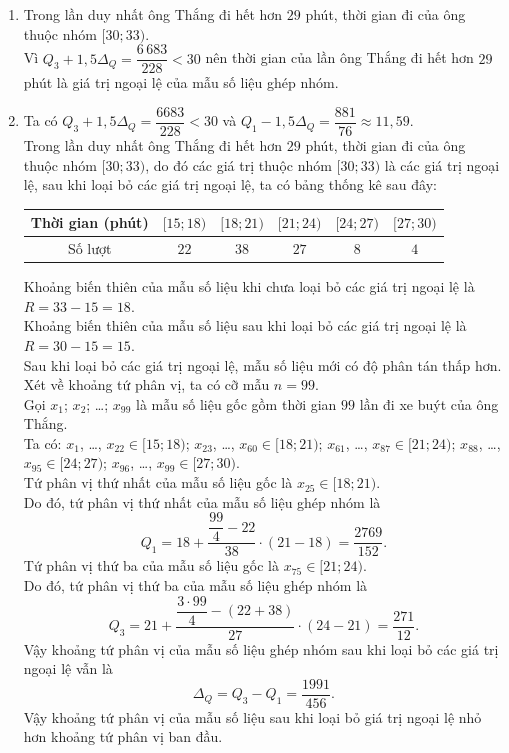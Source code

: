 \begin{bt}[Mức độ 3]
{\begin{enumerate}
				$$Q_3=21+\dfrac{\dfrac{3\cdot100}{4}-(22+38)}{27}\cdot(24-21)=\dfrac{68}{3}.$$
				Vậy khoảng tứ phân vị của mẫu số liệu ghép nhóm là $$\Delta_Q=Q_3-Q_1=\dfrac{505}{114}.$$
				\item Trong lần duy nhất ông Thắng đi hết hơn $29$ phút, thời gian đi của ông thuộc nhóm $[30;33)$.\\
				Vì $Q_3+1{,}5\Delta_Q=\dfrac{6\,683}{228}<30$ nên thời gian của lần ông Thắng đi hết hơn $29$ phút là giá trị ngoại lệ của mẫu số liệu ghép nhóm.
				\item 
				Ta có $Q_3+1{,}5\Delta_Q=\dfrac{6683}{228}<30$ và $Q_1-1{,}5\Delta_Q=\dfrac{881}{76}\approx11{,}59$.\\
				Trong lần duy nhất ông Thắng đi hết hơn $29$ phút, thời gian đi của ông thuộc nhóm $[30;33)$, do đó các giá trị thuộc nhóm $[30;33)$ là các giá trị ngoại lệ, sau khi loại bỏ các giá trị ngoại lệ, ta có bảng thống kê sau đây:
				\begin{center}
					\begin{tabular}{|c|c|c|c|c|c|}
						\hline
						Thời gian (phút) & $[15;18)$ & $[18;21)$ & $[21;24)$ & $[24;27)$ & $[27;30)$ \\
						\hline
						Số lượt & $22$ & $38$ & $27$ & $8$ & $4$ \\
						\hline
					\end{tabular}
				\end{center}
				Khoảng biến thiên của mẫu số liệu khi chưa loại bỏ các giá trị ngoại lệ là $R=33-15=18$.\\
				Khoảng biến thiên của mẫu số liệu sau khi loại bỏ các giá trị ngoại lệ là $R=30-15=15$.\\
				Sau khi loại bỏ các giá trị ngoại lệ, mẫu số liệu mới có độ phân tán thấp hơn.\\
				Xét về khoảng tứ phân vị, ta có cỡ mẫu $n=99$.\\
				Gọi $x_1$; $x_2$; \ldots; $x_{99}$ là mẫu số liệu gốc gồm thời gian $99$ lần đi xe buýt của ông Thắng.\\ Ta có: $x_1$, \ldots, $x_{22}\in[15;18)$; $x_{23}$, \ldots, $x_{60}\in[18;21)$; $x_{61}$, \ldots, $x_{87}\in[21;24)$; $x_{88}$, \ldots, $x_{95}\in[24;27)$; $x_{96}$, \ldots, $x_{99}\in[27;30)$.\\
				Tứ phân vị thứ nhất của mẫu số liệu gốc là $x_{25}\in[18;21)$.\\ Do đó, tứ phân vị thứ nhất của mẫu số liệu ghép nhóm là
				$$Q_1=18+\dfrac{\dfrac{99}{4}-22}{38}\cdot(21-18)=\dfrac{2769}{152}.$$
				Tứ phân vị thứ ba của mẫu số liệu gốc là $x_{75}\in[21;24)$.\\ Do đó, tứ phân vị thứ ba của mẫu số liệu ghép nhóm là
				$$Q_3=21+\dfrac{\dfrac{3\cdot99}{4}-(22+38)}{27}\cdot(24-21)=\dfrac{271}{12}.$$
				Vậy khoảng tứ phân vị của mẫu số liệu ghép nhóm sau khi loại bỏ các giá trị ngoại lệ vẫn là $$\Delta_Q=Q_3-Q_1=\dfrac{1991}{456}.$$
				Vậy khoảng tứ phân vị của mẫu số liệu sau khi loại bỏ giá trị ngoại lệ nhỏ hơn khoảng tứ phân vị ban đầu.
		\end{enumerate}}
	\end{bt}
